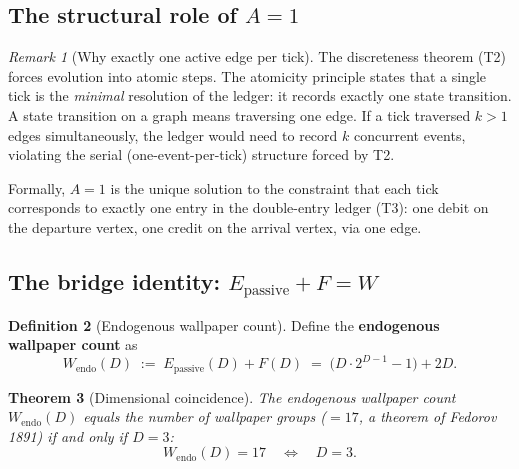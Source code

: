 \documentclass[11pt,a4paper]{article}
\newtheorem{theorem}{Theorem}[section]
\theoremstyle{definition}
\newtheorem{definition}[theorem]{Definition}
\theoremstyle{remark}
\newtheorem{remark}[theorem]{Remark}
\newcommand{\Epass}{E_{\mathrm{passive}}}
\begin{document}
\subsection{The structural role of $A = 1$}

\begin{remark}[Why exactly one active edge per tick]
\label{rem:A_equals_1}
The discreteness theorem (T2) forces evolution into atomic steps.  The
atomicity principle states that a single tick is the \emph{minimal}
resolution of the ledger: it records exactly one state transition.  A state
transition on a graph means traversing one edge.  If a tick traversed $k > 1$
edges simultaneously, the ledger would need to record $k$ concurrent events,
violating the serial (one-event-per-tick) structure forced by T2.

Formally, $A = 1$ is the unique solution to the constraint that each tick
corresponds to exactly one entry in the double-entry ledger (T3): one debit
on the departure vertex, one credit on the arrival vertex, via one edge.
\end{remark}

\subsection{The bridge identity: $\Epass + F = W$}

\begin{definition}[Endogenous wallpaper count]
\label{def:W_endogenous}
Define the \textbf{endogenous wallpaper count} as
\begin{equation}
  W_{\mathrm{endo}}(D) \;:=\; \Epass(D) + F(D) \;=\;
  \bigl(D \cdot 2^{D-1} - 1\bigr) + 2D.
  \label{eq:W_endo}
\end{equation}
\end{definition}

\begin{theorem}[Dimensional coincidence]
\label{thm:dim_coincidence}
The endogenous wallpaper count $W_{\mathrm{endo}}(D)$ equals the number of
wallpaper groups ($= 17$, a theorem of Fedorov 1891) if and only if $D = 3$:
\begin{equation}
  \boxed{W_{\mathrm{endo}}(D) = 17 \quad\Longleftrightarrow\quad D = 3.}
  \label{eq:W_iff_D3}
\end{equation}
\end{theorem}
\end{document}
